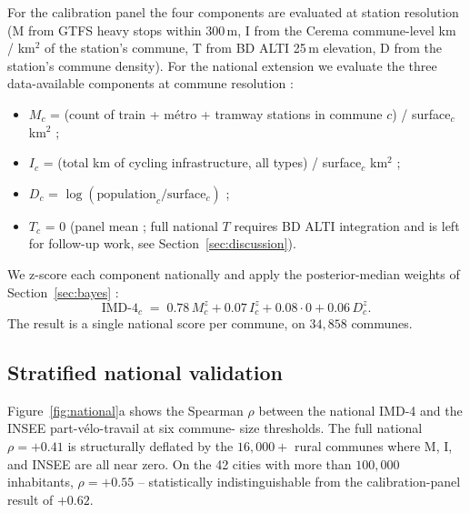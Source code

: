 \documentclass[11pt,a4paper]{article}
\newcommand{\IMD}{\mathrm{IMD}}
\begin{document}
For the calibration panel the four components are evaluated at
station resolution (M from GTFS heavy stops within 300\,m, I from
the Cerema commune-level km / km$^{2}$ of the station's commune,
T from BD ALTI 25\,m elevation, D from the station's commune
density).  For the national extension we evaluate the three
data-available components at commune resolution :
\begin{itemize}[label=$\bullet$,leftmargin=*]
    \item $M_c$ = (count of train + m\'etro + tramway stations in
          commune $c$) / surface$_c$ km$^{2}$ ;
    \item $I_c$ = (total km of cycling infrastructure, all types)
          / surface$_c$ km$^{2}$ ;
    \item $D_c$ = $\log(\text{population}_c / \text{surface}_c)$ ;
    \item $T_c$ = $0$ (panel mean ; full national $T$ requires
          BD ALTI integration and is left for follow-up work, see
          Section~\ref{sec:discussion}).
\end{itemize}

We z-score each component nationally and apply the
posterior-median weights of Section~\ref{sec:bayes} :
\[
    \IMD\text{-}4_c \;=\; 0.78\, M_c^{z} + 0.07\, I_c^{z} + 0.08 \cdot 0 + 0.06\, D_c^{z}.
\]
The result is a single national score per commune, on $34{,}858$
communes.

\subsection{Stratified national validation}

Figure~\ref{fig:national}a shows the Spearman $\rho$ between the
national IMD-4 and the INSEE part-v\'elo-travail at six commune-
size thresholds.  The full national $\rho = +0.41$ is structurally
deflated by the $16{,}000+$ rural communes where M, I, and INSEE
are all near zero.  On the 42 cities with more than $100{,}000$
inhabitants, $\rho = +0.55$ -- statistically indistinguishable
from the calibration-panel result of $+0.62$.
\end{document}
